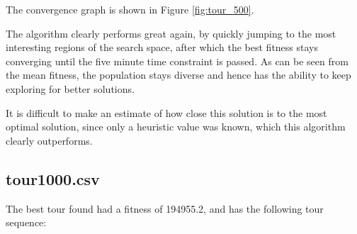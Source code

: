 \documentclass[a4paper,10pt]{article}
\newcommand{\ReplaceMe}[1]{{\color{blue}#1}}
\begin{document}
The convergence graph is shown in Figure \ref{fig:tour_500}.

The algorithm clearly performs great again, by quickly jumping to the most interesting regions of the search space, after which the best fitness stays converging until the five minute time constraint is passed. As can be seen from the mean fitness, the population stays diverse and hence has the ability to keep exploring for better solutions.

It is difficult to make an estimate of how close this solution is to the most optimal solution, since only a heuristic value was known, which this algorithm clearly outperforms.


\subsection{tour1000.csv}




The best tour found had a fitness of 194955.2, and has the following tour sequence:
\end{document}
